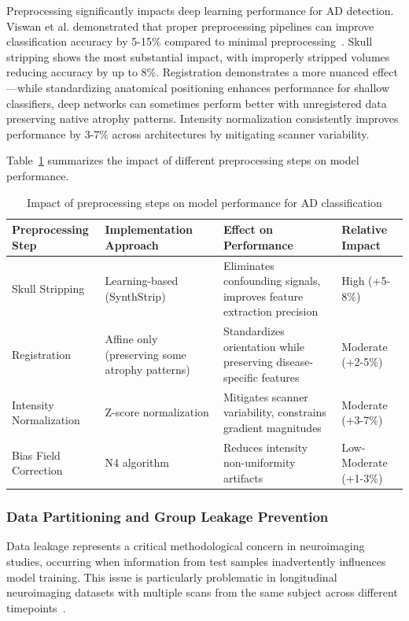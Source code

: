 \documentclass[11pt, a4paper]{article}
\begin{document}
Preprocessing significantly impacts deep learning performance for AD detection. Viswan et al. demonstrated that proper preprocessing pipelines can improve classification accuracy by 5-15\% compared to minimal preprocessing~\cite{viswan2025enhancing}. Skull stripping shows the most substantial impact, with improperly stripped volumes reducing accuracy by up to 8\%. Registration demonstrates a more nuanced effect—while standardizing anatomical positioning enhances performance for shallow classifiers, deep networks can sometimes perform better with unregistered data preserving native atrophy patterns. Intensity normalization consistently improves performance by 3-7\% across architectures by mitigating scanner variability.

Table~\ref{tab:preprocessing_impact} summarizes the impact of different preprocessing steps on model performance.

\begin{table}[htbp]
\centering
\begin{tabular}{|p{3cm}|p{5cm}|p{5cm}|p{2cm}|}
\hline
\textbf{Preprocessing Step} & \textbf{Implementation Approach} & \textbf{Effect on Performance} & \textbf{Relative Impact} \\
\hline
Skull Stripping & Learning-based (SynthStrip) & Eliminates confounding signals, improves feature extraction precision & High (+5-8\%) \\
\hline
Registration & Affine only (preserving some atrophy patterns) & Standardizes orientation while preserving disease-specific features & Moderate (+2-5\%) \\
\hline
Intensity Normalization & Z-score normalization & Mitigates scanner variability, constrains gradient magnitudes & Moderate (+3-7\%) \\
\hline
Bias Field Correction & N4 algorithm & Reduces intensity non-uniformity artifacts & Low-Moderate (+1-3\%) \\
\hline
\end{tabular}
\caption{Impact of preprocessing steps on model performance for AD classification}
\label{tab:preprocessing_impact}
\end{table}

\subsubsection{Data Partitioning and Group Leakage Prevention}
\label{subsec:data_partitioning}

Data leakage represents a critical methodological concern in neuroimaging studies, occurring when information from test samples inadvertently influences model training. This issue is particularly problematic in longitudinal neuroimaging datasets with multiple scans from the same subject across different timepoints~\cite{davatzikos2019machine}.
\end{document}
